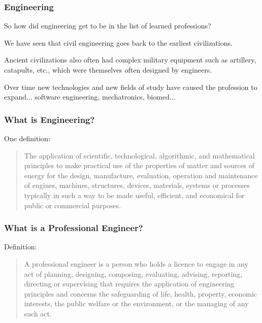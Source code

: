 \begin{frame}
\frametitle{Engineering}

So how did engineering get to be in the list of learned professions?

We have seen that civil engineering goes back to the earliest civilizations.

Ancient civilizations also often had complex military equipment such as artillery, catapults, etc., which were themselves often designed by engineers.

Over time new technologies and new fields of study have caused the profession to expand... software engineering, mechatronics, biomed... 

\end{frame}



\begin{frame}
\frametitle{What is Engineering?}

One definition:

\begin{quote}

The application of scientific, technological, algorithmic, and mathematical principles to make practical use of the properties of matter and sources of energy for the design, manufacture, evaluation, operation and maintenance of engines, machines, structures, devices, materials, systems or processes typically in such a way to be made useful, efficient, and economical for public or commercial purposes.

\end{quote}

\end{frame}



\begin{frame}
\frametitle{What is a Professional Engineer?}

Definition:

\begin{quote}
A \alert{professional engineer} is a person who holds a licence to engage in any act of planning, designing, composing, evaluating, advising, reporting, directing or supervising that requires the application of engineering principles and concerns the safeguarding of life, health, property, economic interests, the public welfare or the environment, or the managing of any such act.
\end{quote}


\end{frame}



